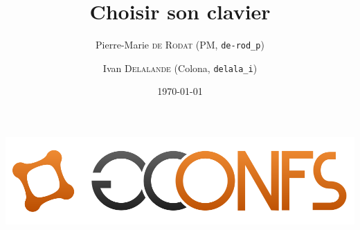 \documentclass{beamer}
\title{Choisir son clavier}
\author[PM \and Colona]{
  Pierre-Marie \textsc{de Rodat} (PM, \texttt{de-rod\_p})\\
  \and Ivan \textsc{Delalande} (Colona, \texttt{delala\_i})
}
\date{\today}
\begin{document}
\begin{frame}
    \begin{center}
        \includegraphics[scale=0.35]{images/gconfs.png}
    \end{center}
    \maketitle
\end{frame}









\end{document}
